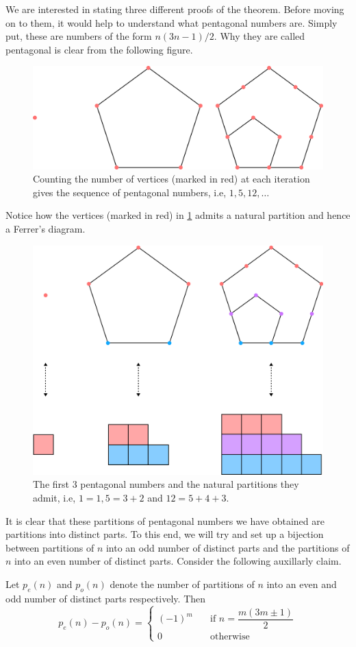 We are interested in stating three different proofs of the theorem. Before moving on to them, it would help to understand what pentagonal numbers are. Simply put, these are numbers of the form $n(3n-1)/2$. Why they are called pentagonal is clear from the following figure.
\begin{figure}[H]
    \centering
    \includegraphics[width=0.8\linewidth]{Images/Figure20.png}
    \caption{Counting the number of vertices (marked in red) at each iteration gives the sequence of pentagonal numbers, i.e, $1,5,12,\ldots$}
    \label{f:PNT}
\end{figure}
Notice how the vertices (marked in red) in \cref{f:PNT} admits a natural partition and hence a Ferrer's diagram. 
\begin{figure}[H]
    \centering
    \includegraphics[width=0.8\linewidth]{Images/Figure21.png}
    \caption{The first $3$ pentagonal numbers and the natural partitions they admit, i.e, $1=1, 5=3+2$ and $12=5+4+3$.}
\end{figure}
It is clear that these partitions of pentagonal numbers we have obtained are partitions into distinct parts. To this end, we will try and set up a bijection between partitions of $n$ into an odd number of distinct parts and the partitions of $n$ into an even number of distinct parts. Consider the following auxillarly claim.
\begin{claim}
Let $p_{e}(n)$ and $p_{o}(n)$ denote the number of partitions of $n$ into an even and odd number of distinct parts respectively. Then
\[
p_{e}(n)-p_{o}(n) = \begin{cases}
    (-1)^m \quad &\text{if } n = \dfrac{m(3m\pm 1)}{2} \\
    0 \quad &\text{otherwise}
\end{cases}
\]
\label{t:EPT_Aux}
\end{claim}
